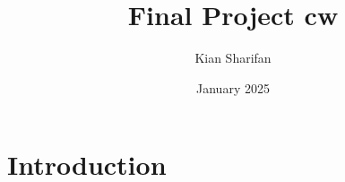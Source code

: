 \documentclass{article}
\title{Final Project cw}
\author{Kian Sharifan}
\date{January 2025}
\begin{document}
\maketitle
\newpage
\tableofcontents
\newpage

\section{Introduction}
\end{document}
